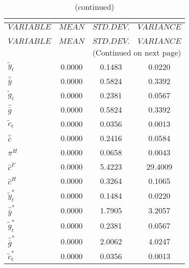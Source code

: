  
\begin{center}
\begin{longtable}{lccc} 
\caption{THEORETICAL MOMENTS}\\
 \label{Table:th_moments}\\
\toprule 
$VARIABLE           $	 & 	 $         MEAN$	 & 	 $    STD. DEV.$	 & 	 $     VARIANCE$\\
\midrule \endfirsthead 
\caption{(continued)}\\
 \toprule \\ 
$VARIABLE           $	 & 	 $         MEAN$	 & 	 $    STD. DEV.$	 & 	 $     VARIANCE$\\
\midrule \endhead 
\midrule \multicolumn{4}{r}{(Continued on next page)} \\ \bottomrule \endfoot 
\bottomrule \endlastfoot 
${\tilde y_t}       $	 & 	       0.0000	 & 	       0.1483	 & 	       0.0220 \\ 
${\hat {\bar y}}    $	 & 	       0.0000	 & 	       0.5824	 & 	       0.3392 \\ 
${\tilde g_t}       $	 & 	       0.0000	 & 	       0.2381	 & 	       0.0567 \\ 
${\hat {\bar g}}    $	 & 	       0.0000	 & 	       0.5824	 & 	       0.3392 \\ 
${\tilde c_t}       $	 & 	       0.0000	 & 	       0.0356	 & 	       0.0013 \\ 
${\hat {\bar c}}    $	 & 	       0.0000	 & 	       0.2416	 & 	       0.0584 \\ 
${\pi^H}            $	 & 	       0.0000	 & 	       0.0658	 & 	       0.0043 \\ 
${\hat c^F}         $	 & 	       0.0000	 & 	       5.4223	 & 	      29.4009 \\ 
${\hat c^H}         $	 & 	       0.0000	 & 	       0.3264	 & 	       0.1065 \\ 
${\tilde y_t^*}     $	 & 	       0.0000	 & 	       0.1484	 & 	       0.0220 \\ 
${\hat {\bar y}^*}  $	 & 	       0.0000	 & 	       1.7905	 & 	       3.2057 \\ 
${\tilde g_t^*}     $	 & 	       0.0000	 & 	       0.2381	 & 	       0.0567 \\ 
${\hat {\bar g}^*}  $	 & 	       0.0000	 & 	       2.0062	 & 	       4.0247 \\ 
${\tilde c_t^*}     $	 & 	       0.0000	 & 	       0.0356	 & 	       0.0013 \\ 

\end{longtable}
\end{center}
